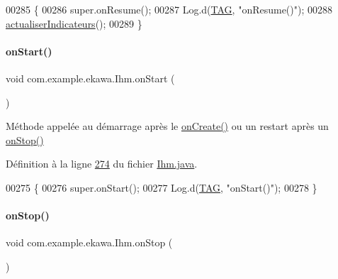 \begin{DoxyCode}
00285     \{
00286         super.onResume();
00287         Log.d(\hyperlink{classcom_1_1example_1_1ekawa_1_1_ihm_a95cd92c2acaf9f8982302da08d94f9aa}{TAG}, \textcolor{stringliteral}{"onResume()"});
00288         \hyperlink{classcom_1_1example_1_1ekawa_1_1_ihm_a2c3740dd5be20b3111b36649514fd41e}{actualiserIndicateurs}();
00289     \}
\end{DoxyCode}
\mbox{\label{classcom_1_1example_1_1ekawa_1_1_ihm_a5cf91e6625760cbdca208988a08e86f6}} 
\paragraph{\texorpdfstring{on\+Start()}{onStart()}}
{\footnotesize\ttfamily void com.\+example.\+ekawa.\+Ihm.\+on\+Start (\begin{DoxyParamCaption}{ }\end{DoxyParamCaption})\hspace{0.3cm}{\ttfamily [protected]}}



Méthode appelée au démarrage après le \hyperlink{classcom_1_1example_1_1ekawa_1_1_ihm_af37a1d1d731eaed5e9cc19d23475ede3}{on\+Create()} ou un restart après un \hyperlink{classcom_1_1example_1_1ekawa_1_1_ihm_adc7bc6671d8cd5018724bcbf4fbc0d75}{on\+Stop()} 



Définition à la ligne \hyperlink{_ihm_8java_source_l00274}{274} du fichier \hyperlink{_ihm_8java_source}{Ihm.\+java}.


\begin{DoxyCode}
00275     \{
00276         super.onStart();
00277         Log.d(\hyperlink{classcom_1_1example_1_1ekawa_1_1_ihm_a95cd92c2acaf9f8982302da08d94f9aa}{TAG}, \textcolor{stringliteral}{"onStart()"});
00278     \}
\end{DoxyCode}
\mbox{\label{classcom_1_1example_1_1ekawa_1_1_ihm_adc7bc6671d8cd5018724bcbf4fbc0d75}} 
\paragraph{\texorpdfstring{on\+Stop()}{onStop()}}
{\footnotesize\ttfamily void com.\+example.\+ekawa.\+Ihm.\+on\+Stop (\begin{DoxyParamCaption}{ }\end{DoxyParamCaption})\hspace{0.3cm}{\ttfamily [protected]}}



